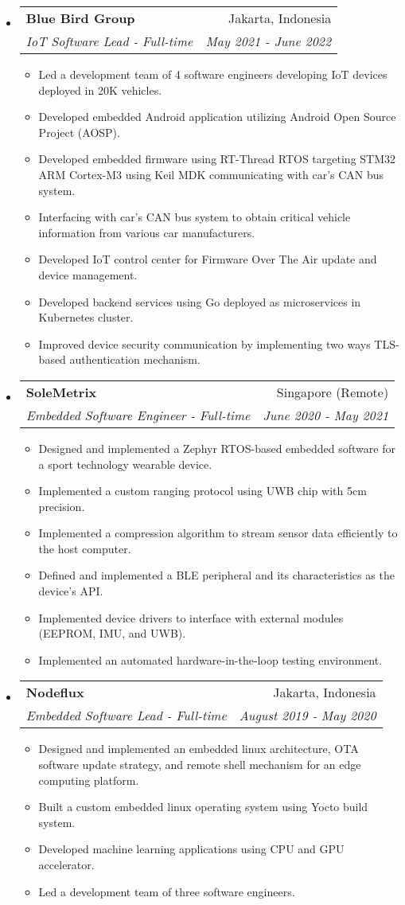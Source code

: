\documentclass[letterpaper,9pt]{article}
\makeatletter
\newcommand{\resitem}[1]{\item #1 \vspace{-2pt}}
\newcommand{\ressubheading}[4]{
\begin{tabular*}{7.0in}{l@{\cftdotfill{\cftsecdotsep}\extracolsep{\fill}}r}
		\textbf{#1} & #2 \\
        \textit{#3} & \textit{#4} \\
\end{tabular*}\vspace{-6.3pt}}
\makeatother
\begin{document}
\begin{itemize}
  \item 
    \ressubheading{Blue Bird Group}{Jakarta, Indonesia}{IoT Software Lead - Full-time}{May 2021 - June 2022}
    \begin{itemize}
      \resitem{Led a development team of 4 software engineers developing IoT devices deployed in 20K vehicles.} 
      \resitem{Developed embedded Android application utilizing Android Open Source Project (AOSP).}
      \resitem{Developed embedded firmware using RT-Thread RTOS targeting STM32 ARM Cortex-M3 using Keil MDK communicating with car's CAN bus system.}
      \resitem{Interfacing with car's CAN bus system to obtain critical vehicle information from various car manufacturers.}
      \resitem{Developed IoT control center for Firmware Over The Air update and device management.}
      \resitem{Developed backend services using Go deployed as microservices in Kubernetes cluster.}
      \resitem{Improved device security communication by implementing two ways TLS-based authentication mechanism.}
    \end{itemize}
  
  \item
        \ressubheading{SoleMetrix}{Singapore (Remote)}{Embedded Software Engineer - Full-time}{June 2020 - May 2021}
        \begin{itemize}
          \resitem{Designed and implemented a Zephyr RTOS-based embedded software for a sport technology wearable device.}
          \resitem{Implemented a custom ranging protocol using UWB chip with 5cm precision.}
          \resitem{Implemented a compression algorithm to stream sensor data efficiently to the host computer.}
          \resitem{Defined and implemented a BLE peripheral and its characteristics as the device's API.}
          \resitem{Implemented device drivers to interface with external modules (EEPROM, IMU, and UWB).}
          \resitem{Implemented an automated hardware-in-the-loop testing environment.}
        \end{itemize}

  \item
        \ressubheading{Nodeflux}{Jakarta, Indonesia}{Embedded Software Lead - Full-time}{August 2019 - May 2020}
        \begin{itemize}
          \resitem{Designed and implemented an embedded linux architecture, OTA software update strategy, and remote shell mechanism for an edge computing platform.}
          \resitem{Built a custom embedded linux operating system using Yocto build system.}
          \resitem{Developed machine learning applications using CPU and GPU accelerator.}
          \resitem{Led a development team of three software engineers.}
        \end{itemize}


\end{itemize}
\end{document}

